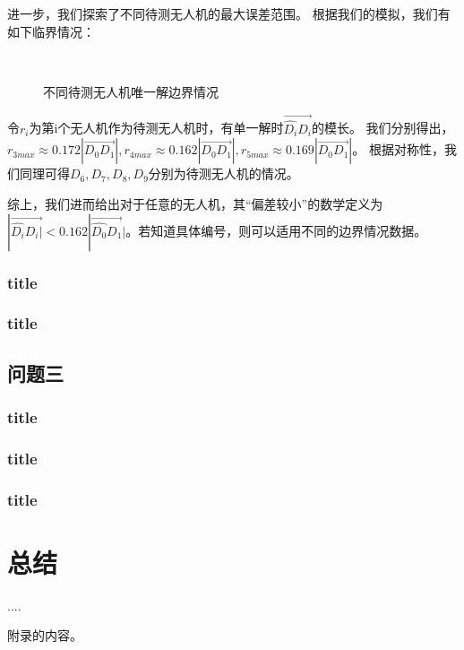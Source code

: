 \documentclass{cumcmthesis}
\begin{document}
			进一步，我们探索了不同待测无人机的最大误差范围。
			根据我们的模拟，我们有如下临界情况：
			\begin{figure}[H]
				\centering
				\\
				\caption{不同待测无人机唯一解边界情况}
				\label{fig12}
			\end{figure}
			令$r_i$为第i个无人机作为待测无人机时，有单一解时$\overrightarrow{\widehat{D_i}D_i}$的模长。
			我们分别得出，$r_{3max}\approx 0.172\left| \overrightarrow{D_0D_1} \right|,r_{4max}\approx 0.162\left| \overrightarrow{D_0D_1} \right|,r_{5max}\approx 0.169\left| \overrightarrow{D_0D_1} \right|$。
			根据对称性，我们同理可得$D_6,D_7,D_8,D_9$分别为待测无人机的情况。
			
			综上，我们进而给出对于任意的无人机，其“偏差较小”的数学定义为$|\overrightarrow{\widehat{D_i}D_i|}<0.162|\overrightarrow{\widehat{D_0}D_1}|$。若知道具体编号，则可以适用不同的边界情况数据。
			\subsubsection{title}
			\subsubsection{title}
		\subsection{问题三}
			\subsubsection{title}
			\subsubsection{title}
			\subsubsection{title}
	\section{总结}
	\begin{thebibliography}{9}%
		 ....
	\end{thebibliography}
	\begin{appendices}
		附录的内容。
	\end{appendices}
\end{document}
